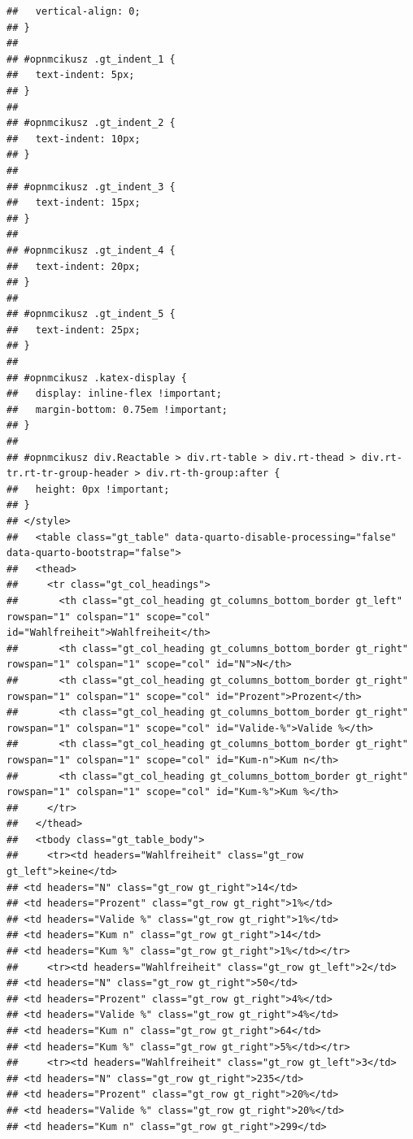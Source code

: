 \documentclass[
  a4paper,
  DIV=11,
  numbers=noendperiod]{scrartcl}
\begin{document}
\begin{verbatim}
##   vertical-align: 0;
## }
## 
## #opnmcikusz .gt_indent_1 {
##   text-indent: 5px;
## }
## 
## #opnmcikusz .gt_indent_2 {
##   text-indent: 10px;
## }
## 
## #opnmcikusz .gt_indent_3 {
##   text-indent: 15px;
## }
## 
## #opnmcikusz .gt_indent_4 {
##   text-indent: 20px;
## }
## 
## #opnmcikusz .gt_indent_5 {
##   text-indent: 25px;
## }
## 
## #opnmcikusz .katex-display {
##   display: inline-flex !important;
##   margin-bottom: 0.75em !important;
## }
## 
## #opnmcikusz div.Reactable > div.rt-table > div.rt-thead > div.rt-tr.rt-tr-group-header > div.rt-th-group:after {
##   height: 0px !important;
## }
## </style>
##   <table class="gt_table" data-quarto-disable-processing="false" data-quarto-bootstrap="false">
##   <thead>
##     <tr class="gt_col_headings">
##       <th class="gt_col_heading gt_columns_bottom_border gt_left" rowspan="1" colspan="1" scope="col" id="Wahlfreiheit">Wahlfreiheit</th>
##       <th class="gt_col_heading gt_columns_bottom_border gt_right" rowspan="1" colspan="1" scope="col" id="N">N</th>
##       <th class="gt_col_heading gt_columns_bottom_border gt_right" rowspan="1" colspan="1" scope="col" id="Prozent">Prozent</th>
##       <th class="gt_col_heading gt_columns_bottom_border gt_right" rowspan="1" colspan="1" scope="col" id="Valide-%">Valide %</th>
##       <th class="gt_col_heading gt_columns_bottom_border gt_right" rowspan="1" colspan="1" scope="col" id="Kum-n">Kum n</th>
##       <th class="gt_col_heading gt_columns_bottom_border gt_right" rowspan="1" colspan="1" scope="col" id="Kum-%">Kum %</th>
##     </tr>
##   </thead>
##   <tbody class="gt_table_body">
##     <tr><td headers="Wahlfreiheit" class="gt_row gt_left">keine</td>
## <td headers="N" class="gt_row gt_right">14</td>
## <td headers="Prozent" class="gt_row gt_right">1%</td>
## <td headers="Valide %" class="gt_row gt_right">1%</td>
## <td headers="Kum n" class="gt_row gt_right">14</td>
## <td headers="Kum %" class="gt_row gt_right">1%</td></tr>
##     <tr><td headers="Wahlfreiheit" class="gt_row gt_left">2</td>
## <td headers="N" class="gt_row gt_right">50</td>
## <td headers="Prozent" class="gt_row gt_right">4%</td>
## <td headers="Valide %" class="gt_row gt_right">4%</td>
## <td headers="Kum n" class="gt_row gt_right">64</td>
## <td headers="Kum %" class="gt_row gt_right">5%</td></tr>
##     <tr><td headers="Wahlfreiheit" class="gt_row gt_left">3</td>
## <td headers="N" class="gt_row gt_right">235</td>
## <td headers="Prozent" class="gt_row gt_right">20%</td>
## <td headers="Valide %" class="gt_row gt_right">20%</td>
## <td headers="Kum n" class="gt_row gt_right">299</td>

\end{verbatim}
\end{document}
